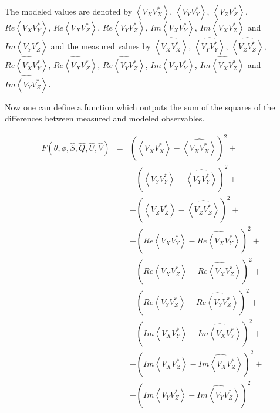 \documentclass[a4paper,14pt]{extbook}
\begin{document}
The modeled values are denoted by  $\left\langle V_X V_X^{*} \right\rangle$,  $\left\langle V_Y V_Y^{*} \right\rangle$,  $\left\langle V_Z V_Z^{*} \right\rangle$,  \\ $Re\left\langle V_X V_Y^{*} \right\rangle$, $Re\left\langle V_X V_Z^{*} \right\rangle$, $Re\left\langle V_Y V_Z^{*} \right\rangle$, $Im\left\langle V_X V_Y^{*} \right\rangle$, $Im\left\langle V_X V_Z^{*} \right\rangle$ and \\ $Im\left\langle V_Y V_Z^{*} \right\rangle$ and the measured values by $\widehat{\left\langle V_X V_X^{*} \right\rangle}$,  $\widehat{\left\langle V_Y V_Y^{*} \right\rangle}$,  $\widehat{\left\langle V_Z V_Z^{*} \right\rangle}$, \\ $\widehat{Re\left\langle V_X V_Y^{*} \right\rangle}$, $\widehat{Re\left\langle V_X V_Z^{*} \right\rangle}$, $\widehat{Re\left\langle V_Y V_Z^{*} \right\rangle}$, $\widehat{Im\left\langle V_X V_Y^{*} \right\rangle}$, $\widehat{Im\left\langle V_X V_Z^{*} \right\rangle}$ and \\ $\widehat{Im\left\langle V_Y V_Z^{*} \right\rangle}$.


Now one can define a function which outputs the sum of the squares of the differences between measured and modeled observables.

\begin{eqnarray}
F(\theta , \phi, \hat{S},\hat{Q},\hat{U},\hat{V})&=&(\left\langle V_X V_X^{*} \right\rangle - \widehat{\left\langle V_X V_X^{*} \right\rangle})^2+\\
&&+(\left\langle V_Y V_Y^{*} \right\rangle - \widehat{\left\langle V_Y V_Y^{*} \right\rangle})^2 +\nonumber \\
&&+(\left\langle V_Z V_Z^{*} \right\rangle - \widehat{\left\langle V_Z V_Z^{*} \right\rangle})^2 +\nonumber \\
&&+(Re\left\langle V_X V_Y^{*} \right\rangle - \widehat{Re\left\langle V_X V_Y^{*} \right\rangle})^2 +\nonumber \\
&&+(Re\left\langle V_X V_Z^{*} \right\rangle - \widehat{Re\left\langle V_X V_Z^{*} \right\rangle})^2 +\nonumber \\
&&+(Re\left\langle V_Y V_Z^{*} \right\rangle - \widehat{Re\left\langle V_Y V_Z^{*} \right\rangle})^2 +\nonumber \\
&&+(Im\left\langle V_X V_Y^{*} \right\rangle - \widehat{Im\left\langle V_X V_Y^{*} \right\rangle})^2 +\nonumber \\
&&+(Im\left\langle V_X V_Z^{*} \right\rangle - \widehat{Im\left\langle V_X V_Z^{*} \right\rangle})^2 +\nonumber\\
&&+(Im\left\langle V_Y V_Z^{*} \right\rangle - \widehat{Im\left\langle V_Y V_Z^{*} \right\rangle})^2 \nonumber
\end{eqnarray}
\end{document}
